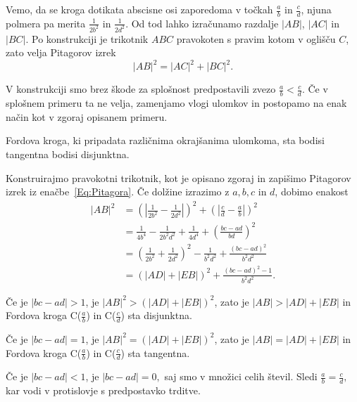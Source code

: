 \documentclass[mat1]{fmfdelo}
\begin{document}
Vemo, da se kroga dotikata abscisne osi zaporedoma v točkah $\frac{a}{b}$ in $\frac{c}{d}$, njuna polmera pa merita $\frac{1}{2b^2}$ in $\frac{1}{2d^2}$. Od tod lahko izračunamo razdalje $|AB|$, $|AC|$ in $|BC|$.
Po konstrukciji je trikotnik $ABC$ pravokoten s pravim kotom v oglišču $C$, zato velja Pitagorov izrek
\begin{equation}
\label{Eq:Pitagora}
|AB|^2 = |AC|^2 + |BC|^2. 
\end{equation}

\begin{opomba}
V konstrukciji smo brez škode za splošnost predpostavili zvezo $\frac{a}{b} < \frac{c}{d}$. Če v splošnem primeru ta ne velja, zamenjamo vlogi ulomkov in postopamo na enak način kot v zgoraj opisanem primeru.
\end{opomba}
%

\begin{trditev}
\label{trd:FordDisjTang}
Fordova kroga, ki pripadata različnima okrajšanima ulomkoma, sta bodisi tangentna bodisi disjunktna.
\end{trditev}

\begin{dokaz}
Konstruirajmo pravokotni trikotnik, kot je opisano zgoraj in zapišimo Pitagorov izrek iz enačbe~\eqref{Eq:Pitagora}.
Če dolžine izrazimo z $a, b, c$ in $d$, dobimo enakost
%
\begin{align}
|AB|^2 
  &= \left ( \left| \frac{1}{2b^2} - \frac{1}{2d^2} \right| \right)^2  + \left ( \left| \frac{c}{d} - \frac{a}{b} \right| \right )^2 \nonumber \\ 
  &= \frac{1}{4b^4} - \frac{1}{2b^2d^2} + \frac{1}{4d^4} + \left (\frac{bc-ad}{bd} \right )^2 \nonumber \\
  &= \left (\frac{1}{2b^2} + \frac{1}{2d^2} \right )^2 - \frac{1}{b^2d^2} + \frac{(bc-ad)^2}{b^2d^2} \nonumber \\
  &= (|AD| + |EB|)^2 + \frac{(bc-ad)^2-1}{b^2d^2}.
\end{align}

Če je $|bc-ad|>1$, je $|AB|^2 > (|AD| + |EB|)^2$, zato je $|AB| > |AD| + |EB|$ in Fordova kroga C($\frac{a}{b}$) in C($\frac{c}{d}$) sta disjunktna.

Če je $|bc-ad|=1$, je $|AB|^2 = (|AD| + |EB|)^2$, zato je $|AB| = |AD| + |EB|$ in Fordova kroga C($\frac{a}{b}$) in C($\frac{c}{d}$) sta tangentna.

Če je $|bc-ad|<1$, je $|bc-ad|=0,$ saj smo v množici celih števil. Sledi $\frac{a}{b} = \frac{c}{d},$ kar vodi v protislovje s predpostavko trditve.
\end{dokaz}
\end{document}
